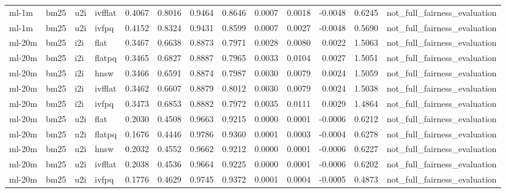 \begin{tabular}{llllrrrrrrrrl}
ml-1m & bm25 & u2i & ivfflat & 0.4067 & 0.8016 & 0.9464 & 0.8646 & 0.0007 & 0.0018 & -0.0048 & 0.6245 & not_full_fairness_evaluation \\
ml-1m & bm25 & u2i & ivfpq & 0.4152 & 0.8324 & 0.9431 & 0.8599 & 0.0007 & 0.0027 & -0.0048 & 0.5690 & not_full_fairness_evaluation \\
ml-20m & bm25 & i2i & flat & 0.3467 & 0.6638 & 0.8873 & 0.7971 & 0.0028 & 0.0080 & 0.0022 & 1.5063 & not_full_fairness_evaluation \\
ml-20m & bm25 & i2i & flatpq & 0.3465 & 0.6827 & 0.8887 & 0.7965 & 0.0033 & 0.0104 & 0.0027 & 1.5051 & not_full_fairness_evaluation \\
ml-20m & bm25 & i2i & hnsw & 0.3466 & 0.6591 & 0.8874 & 0.7987 & 0.0030 & 0.0079 & 0.0024 & 1.5059 & not_full_fairness_evaluation \\
ml-20m & bm25 & i2i & ivfflat & 0.3462 & 0.6607 & 0.8879 & 0.8012 & 0.0030 & 0.0079 & 0.0024 & 1.5038 & not_full_fairness_evaluation \\
ml-20m & bm25 & i2i & ivfpq & 0.3473 & 0.6853 & 0.8882 & 0.7972 & 0.0035 & 0.0111 & 0.0029 & 1.4864 & not_full_fairness_evaluation \\
ml-20m & bm25 & u2i & flat & 0.2030 & 0.4508 & 0.9663 & 0.9215 & 0.0000 & 0.0001 & -0.0006 & 0.6212 & not_full_fairness_evaluation \\
ml-20m & bm25 & u2i & flatpq & 0.1676 & 0.4446 & 0.9786 & 0.9360 & 0.0001 & 0.0003 & -0.0004 & 0.6278 & not_full_fairness_evaluation \\
ml-20m & bm25 & u2i & hnsw & 0.2032 & 0.4552 & 0.9662 & 0.9212 & 0.0000 & 0.0001 & -0.0006 & 0.6227 & not_full_fairness_evaluation \\
ml-20m & bm25 & u2i & ivfflat & 0.2038 & 0.4536 & 0.9664 & 0.9225 & 0.0000 & 0.0001 & -0.0006 & 0.6202 & not_full_fairness_evaluation \\
ml-20m & bm25 & u2i & ivfpq & 0.1776 & 0.4629 & 0.9745 & 0.9372 & 0.0001 & 0.0004 & -0.0005 & 0.4873 & not_full_fairness_evaluation \\
\bottomrule
\end{tabular}
